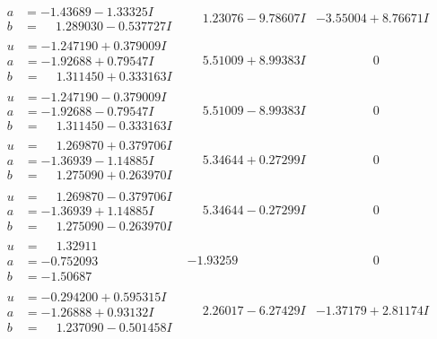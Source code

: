 \documentclass[1p]{elsarticle_modified}
\theoremstyle{definition}
\begin{document}
$$\begin{array}{c|c|c}
\begin{aligned}
a &= -1.43689 - 1.33325 I \\
b &= \phantom{-}1.289030 - 0.537727 I\end{aligned}
 & \phantom{-}1.23076 - 9.78607 I & -3.55004 + 8.76671 I \\ \hline\begin{aligned}
u &= -1.247190 + 0.379009 I \\
a &= -1.92688 + 0.79547 I \\
b &= \phantom{-}1.311450 + 0.333163 I\end{aligned}
 & \phantom{-}5.51009 + 8.99383 I & \phantom{-0.000000 } 0 \\ \hline\begin{aligned}
u &= -1.247190 - 0.379009 I \\
a &= -1.92688 - 0.79547 I \\
b &= \phantom{-}1.311450 - 0.333163 I\end{aligned}
 & \phantom{-}5.51009 - 8.99383 I & \phantom{-0.000000 } 0 \\ \hline\begin{aligned}
u &= \phantom{-}1.269870 + 0.379706 I \\
a &= -1.36939 - 1.14885 I \\
b &= \phantom{-}1.275090 + 0.263970 I\end{aligned}
 & \phantom{-}5.34644 + 0.27299 I & \phantom{-0.000000 } 0 \\ \hline\begin{aligned}
u &= \phantom{-}1.269870 - 0.379706 I \\
a &= -1.36939 + 1.14885 I \\
b &= \phantom{-}1.275090 - 0.263970 I\end{aligned}
 & \phantom{-}5.34644 - 0.27299 I & \phantom{-0.000000 } 0 \\ \hline\begin{aligned}
u &= \phantom{-}1.32911\phantom{ +0.000000I} \\
a &= -0.752093\phantom{ +0.000000I} \\
b &= -1.50687\phantom{ +0.000000I}\end{aligned}
 & -1.93259\phantom{ +0.000000I} & \phantom{-0.000000 } 0 \\ \hline\begin{aligned}
u &= -0.294200 + 0.595315 I \\
a &= -1.26888 + 0.93132 I \\
b &= \phantom{-}1.237090 - 0.501458 I\end{aligned}
 & \phantom{-}2.26017 - 6.27429 I & -1.37179 + 2.81174 I\\

\end{array}$$
\end{document}
